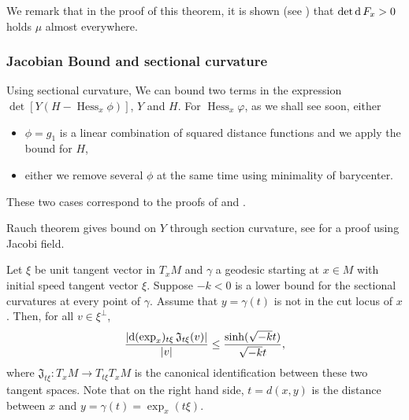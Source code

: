 We remark that in the proof of this theorem,
it is shown (see \cite[Claim 4.3 and Claim 4.4]{cordero2001riemannian}) that
$\det \operatorname{d} F_x > 0$ holds $\mu$ almost everywhere.

\subsubsection{Jacobian Bound and sectional curvature}

Using sectional curvature, We can bound two terms in the expression $\det[ Y(H - \operatorname{Hess}_x \phi)]$, $Y$ and $H$.
For $\operatorname{Hess}_x \varphi$, as we shall see soon, either
\begin{itemize}
	\item $\phi = g_1$ is a linear combination of squared distance functions and we apply the bound for $H$,
	\item either we remove several $\phi$ at the same time using minimality of barycenter.
\end{itemize}
These two cases correspond to the proofs of
 and .

Rauch theorem gives bound on $Y$ through section curvature, see
\cite[Theorem IX.2.3]{chavel2006riemannian} for a proof using Jacobi field.
\begin{prop} 
	Let $\xi$ be unit tangent vector in $T_x M$
	and $\gamma$ a geodesic starting at $x \in M$ with initial speed tangent vector $\xi$.
	Suppose \( - k < 0 \) is a lower bound for
	the sectional curvatures at every point of \( \gamma \).
	Assume that \( y = \gamma (t)\) is not in the cut locus of $x$.
	Then, for all \( v \in \xi ^ { \perp } \),
	\begin{equation*}
		\frac { \left| \operatorname{d} ( \exp _ { x })  _ {t \xi } \,
			\mathfrak{J}_{t \xi}( v )\right| } { | v | }
		\leq \frac { \sinh (\sqrt{ -k } t )} {\sqrt{-k} t },
	\end{equation*}
	where $\mathfrak{J}_{t \xi}: T_x M \rightarrow T_{t \xi} T_x M$ is the canonical identification
	between these two tangent spaces.
	Note that on the right hand side, $t = d(x,y)$ is the distance between $x$ and $ y = \gamma(t) = \exp_x (t\xi)$.
\end{prop}

